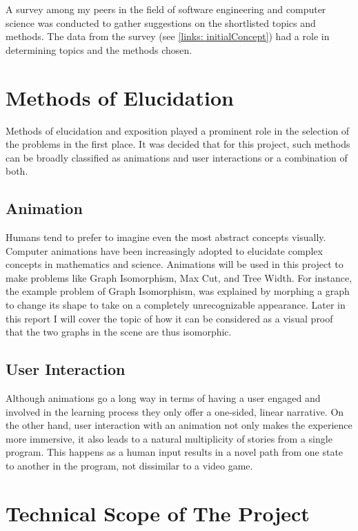 A survey among my
peers in the field of software engineering and computer science was conducted to 
gather suggestions on the shortlisted topics and methods.
The data from the survey (see \autoref{links: initialConcept}) had a role in determining topics and the methods chosen.


\section{Methods of Elucidation}
Methods of elucidation and exposition played a prominent role in the selection of the problems
in the first place. It was decided that for this project, such methods can be
broadly classified as animations and user interactions or a combination of
both.


\subsection{Animation}

Humans tend to prefer to imagine even the most abstract concepts visually.
Computer animations have been increasingly adopted to elucidate complex
concepts in mathematics and science.  Animations will be used in this project to
make problems like Graph Isomorphism, Max Cut, and Tree Width.  For instance,
the example problem of Graph Isomorphism, was explained by morphing a graph to
change its shape to take on a completely unrecognizable appearance. Later in this report I will cover the topic of how it can be considered as a visual proof that the two graphs
in the scene are thus isomorphic.

\subsection{User Interaction}
Although animations go a long way in terms of having a user engaged and involved in
the learning process they only offer a one-sided, linear narrative. On the other hand,
user interaction with an animation not only makes the experience more
immersive, it also leads to a natural multiplicity of stories from a single
program. This happens as a human input results in a novel path from one state
to another in the program, not dissimilar to a video game.

\section{Technical Scope of The Project}
\label{requirements: techScope}

